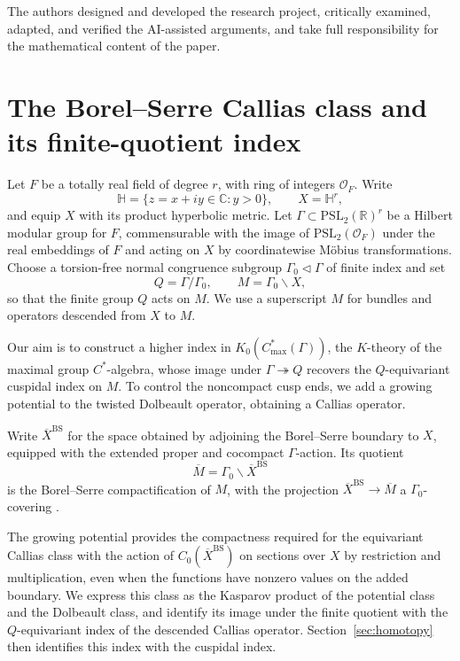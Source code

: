 \documentclass[11pt]{article}
\theoremstyle{definition}
\theoremstyle{plain}
\numberwithin{equation}{section}
\newcommand{\HH}{\mathbb H}
\newcommand{\BS}{\mathrm{BS}}
\begin{document}
The authors designed and developed the research
project, critically examined, adapted, and verified
the AI-assisted arguments, and take full
responsibility for the mathematical content
of the paper.


\section{The Borel--Serre Callias class and its finite-quotient index}
\label{sec:callias}

Let $F$ be a totally real field of degree $r$, with ring of
integers $\mathcal O_F$.  Write
\[
 \HH=\{z=x+iy\in\mathbb C:y>0\},\qquad X=\HH^r,
\]
and equip $X$ with its product hyperbolic metric.
Let $\Gamma\subset\mathrm{PSL}_2(\mathbb R)^r$ be a Hilbert
modular group for $F$, commensurable with the image of
$\mathrm{PSL}_2(\mathcal O_F)$ under the real embeddings of $F$
and acting on $X$ by coordinatewise M\"obius transformations.
Choose a torsion-free normal congruence subgroup
$\Gamma_0\triangleleft\Gamma$ of finite index and set
\[
 Q=\Gamma/\Gamma_0,\qquad M=\Gamma_0\backslash X,
\]
so that the finite group $Q$ acts on $M$.
We use a superscript $M$ for bundles and operators descended
from $X$ to $M$.

Our aim is to construct a higher index in
$K_0(C^*_{\max}(\Gamma))$, the $K$-theory of the maximal group
$C^*$-algebra, whose image under $\Gamma\twoheadrightarrow Q$
recovers the $Q$-equivariant cuspidal index on $M$.
To control the noncompact cusp ends, we add a growing potential
to the twisted Dolbeault operator, obtaining a Callias operator.

Write $\overline X^{\BS}$ for the space obtained by adjoining
the Borel--Serre boundary to $X$, equipped with the extended
proper and cocompact $\Gamma$-action.  Its quotient
\[
 \overline M=\Gamma_0\backslash\overline X^{\BS}
\]
is the Borel--Serre compactification of $M$, with the projection
$\overline X^{\BS}\to\overline M$ a $\Gamma_0$-covering
\cite{BorelSerre}.

The growing potential provides the compactness required for
the equivariant Callias class with the action of
$C_0(\overline X^{\BS})$ on sections over $X$ by restriction
and multiplication, even when the functions have nonzero
values on the added boundary.
We express this class as the Kasparov product of the
potential class and the Dolbeault class, and identify its image
under the finite quotient with the $Q$-equivariant index of the
descended Callias operator.  	Section~\ref{sec:homotopy} then identifies this
index with the cuspidal index.
\end{document}
